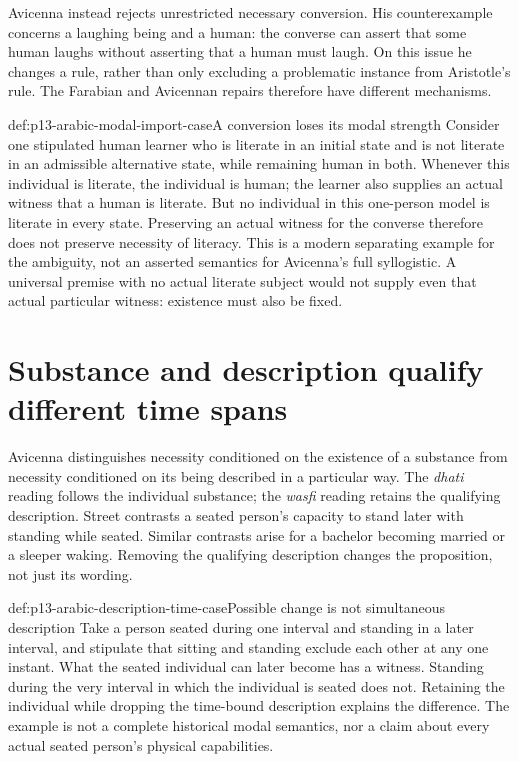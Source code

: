 Avicenna instead rejects unrestricted necessary conversion. His
counterexample concerns a laughing being and a human: the converse
can assert that some human laughs without asserting that a human
must laugh. On this issue he changes a rule, rather than only
excluding a problematic instance from Aristotle's rule. The
Farabian and Avicennan repairs therefore have different mechanisms.
\cite[pp.~258--259]{Street2005LogicSupplement}

\begin{hbexample}{def:p13-arabic-modal-import-case}{A conversion loses its modal strength}
Consider one stipulated human learner who is literate in an initial
state and is not literate in an admissible alternative state, while
remaining human in both. Whenever this individual is literate,
the individual is human; the learner also supplies an actual witness
that a human is literate. But no individual in this one-person model
is literate in every state. Preserving an actual witness for the
converse therefore does not preserve necessity of literacy.
This is a modern separating example for the ambiguity, not an
asserted semantics for Avicenna's full syllogistic. A universal
premise with no actual literate subject would not supply even
that actual particular witness: existence must also be fixed.
\end{hbexample}

\section{Substance and description qualify different time spans}
\label{sec:p13-arabic-substance-description}

Avicenna distinguishes necessity conditioned on the existence of a
substance from necessity conditioned on its being described in a
particular way. The \emph{dhati} reading follows the individual
substance; the \emph{wasfi} reading retains the qualifying description.
Street contrasts a seated person's capacity to stand later with
standing while seated. Similar contrasts arise for a bachelor
becoming married or a sleeper waking. Removing the qualifying
description changes the proposition, not just its wording.
\cite[pp.~259--260]{Street2005LogicSupplement}

\begin{hbexample}{def:p13-arabic-description-time-case}{Possible change is not simultaneous description}
Take a person seated during one interval and standing in a later
interval, and stipulate that sitting and standing exclude each other
at any one instant. What the seated individual can later become
has a witness. Standing during the very interval in which the
individual is seated does not. Retaining the individual while
dropping the time-bound description explains the difference.
The example is not a complete historical modal semantics, nor
a claim about every actual seated person's physical capabilities.
\end{hbexample}

